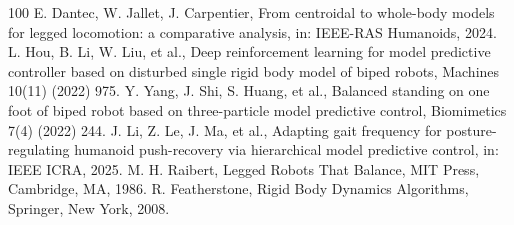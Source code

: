 \documentclass[5p,times]{elsarticle}
\begin{document}
\begin{thebibliography}{100}
 E. Dantec, W. Jallet, J. Carpentier, From centroidal to whole-body models for legged locomotion: a comparative analysis, in: IEEE-RAS Humanoids, 2024.
 L. Hou, B. Li, W. Liu, et al., Deep reinforcement learning for model predictive controller based on disturbed single rigid body model of biped robots, Machines 10(11) (2022) 975.
 Y. Yang, J. Shi, S. Huang, et al., Balanced standing on one foot of biped robot based on three-particle model predictive control, Biomimetics 7(4) (2022) 244.
 J. Li, Z. Le, J. Ma, et al., Adapting gait frequency for posture-regulating humanoid push-recovery via hierarchical model predictive control, in: IEEE ICRA, 2025.
 M. H. Raibert, Legged Robots That Balance, MIT Press, Cambridge, MA, 1986.
 R. Featherstone, Rigid Body Dynamics Algorithms, Springer, New York, 2008.
\end{thebibliography}
\end{document}
